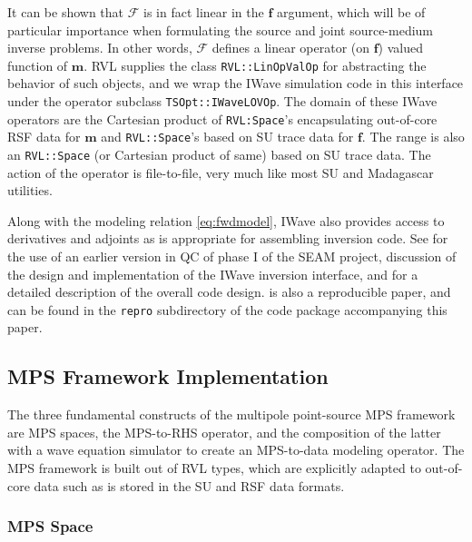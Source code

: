 It can be shown that $\mathcal F$ is in fact linear in the $\mathbf f$ argument, which will be of particular importance when formulating the source and joint source-medium inverse problems.
In other words, $\mathcal F$ defines a linear operator (on $\mathbf f$) valued function of $\mathbf m$. 
RVL supplies the class {\tt RVL::LinOpValOp} for abstracting the behavior of such objects, and we wrap the IWave simulation code in this interface under the operator subclass {\tt TSOpt::IWaveLOVOp}.
The domain of these IWave operators are the Cartesian product of {\tt RVL:Space}'s encapsulating out-of-core RSF data for $\mathbf m$ and {\tt RVL::Space}'s based on SU trace data for $\mathbf f$.
The range is also an {\tt RVL::Space} (or Cartesian product of same) based on SU trace data. 
The action of the operator is file-to-file, very much like most SU and Madagascar utilities.
 
Along with the modeling relation \ref{eq:fwdmodel}, IWave also
provides access to derivatives and adjoints as is appropriate for
assembling inversion code. See \cite{FehlerKeliher:11} for the use of
an earlier version in QC of phase I of the SEAM project,
\cite[]{GeoPros:11} discussion of the design and implementation of
the IWave inversion interface, and \cite[]{trip14:struct} for a detailed
description of the overall code design. \cite[]{trip14:struct} is also a
reproducible paper, and can be found in the {\tt repro} subdirectory
of the code package accompanying this paper.

\subsection{MPS Framework Implementation}

The three fundamental constructs of the multipole point-source MPS framework are MPS spaces, the
MPS-to-RHS operator, and the composition of the latter with a wave
equation simulator to create an MPS-to-data modeling operator.
The MPS framework is built out of RVL types, which are explicitly
adapted to out-of-core data such as is stored in the SU and RSF data
formats. 

\subsubsection{MPS Space}


